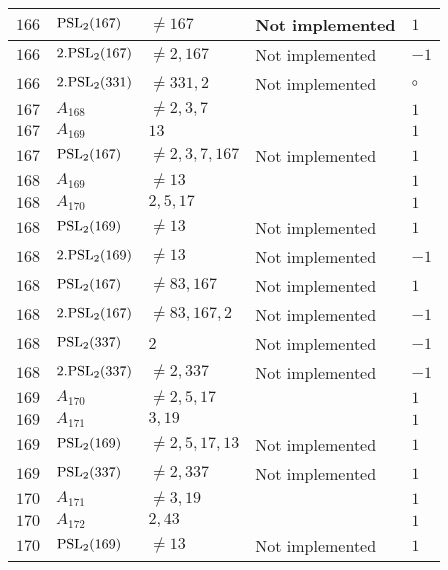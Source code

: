 \documentclass[a4paper, 11pt]{article}
\begin{document}
\begin{longtable}{lllll}
        $ 166 $ & $ {\rm PSL}_{2}(167) $ & $ \neq 167 $ & Not implemented & $ 1  $ \\ \hline
        $ 166 $ & $ 2.{\rm PSL}_{2}(167) $ & $ \neq 2, 167 $ & Not implemented & $ -1  $ \\ \hline
        $ 166 $ & $ 2.{\rm PSL}_{2}(331) $ & $ \neq 331, 2 $ & Not implemented & $\circ$ \\ \hline
        $ 167 $ & $ A_{168} $ & $ \neq 2, 3, 7 $ & $ ~ $ & $ 1  $ \\ \hline
        $ 167 $ & $ A_{169} $ & $ 13 $ & $ ~ $ & $ 1  $ \\ \hline
        $ 167 $ & $ {\rm PSL}_{2}(167) $ & $ \neq 2, 3, 7, 167 $ & Not implemented & $ 1  $ \\ \hline
        $ 168 $ & $ A_{169} $ & $ \neq 13 $ & $ ~ $ & $ 1  $ \\ \hline
        $ 168 $ & $ A_{170} $ & $ 2, 5, 17 $ & $ ~ $ & $ 1  $ \\ \hline
        $ 168 $ & $ {\rm PSL}_{2}(169) $ & $ \neq 13 $ & Not implemented & $ 1  $ \\ \hline
        $ 168 $ & $ 2.{\rm PSL}_{2}(169) $ & $ \neq 13 $ & Not implemented & $ -1  $ \\ \hline
        $ 168 $ & $ {\rm PSL}_{2}(167) $ & $ \neq 83, 167 $ & Not implemented & $ 1  $ \\ \hline
        $ 168 $ & $ 2.{\rm PSL}_{2}(167) $ & $ \neq 83, 167, 2 $ & Not implemented & $ -1  $ \\ \hline
        $ 168 $ & $ {\rm PSL}_{2}(337) $ & $ 2 $ & Not implemented & $ -1  $ \\ \hline
        $ 168 $ & $ 2.{\rm PSL}_{2}(337) $ & $ \neq 2, 337 $ & Not implemented & $ -1  $ \\ \hline
        $ 169 $ & $ A_{170} $ & $ \neq 2, 5, 17 $ & $ ~ $ & $ 1  $ \\ \hline
        $ 169 $ & $ A_{171} $ & $ 3, 19 $ & $ ~ $ & $ 1  $ \\ \hline
        $ 169 $ & $ {\rm PSL}_{2}(169) $ & $ \neq 2, 5, 17, 13 $ & Not implemented & $ 1  $ \\ \hline
        $ 169 $ & $ {\rm PSL}_{2}(337) $ & $ \neq 2, 337 $ & Not implemented & $ 1  $ \\ \hline
        $ 170 $ & $ A_{171} $ & $ \neq 3, 19 $ & $ ~ $ & $ 1  $ \\ \hline
        $ 170 $ & $ A_{172} $ & $ 2, 43 $ & $ ~ $ & $ 1  $ \\ \hline
        $ 170 $ & $ {\rm PSL}_{2}(169) $ & $ \neq 13 $ & Not implemented & $ 1  $ \\ \hline

\end{longtable}
\end{document}
